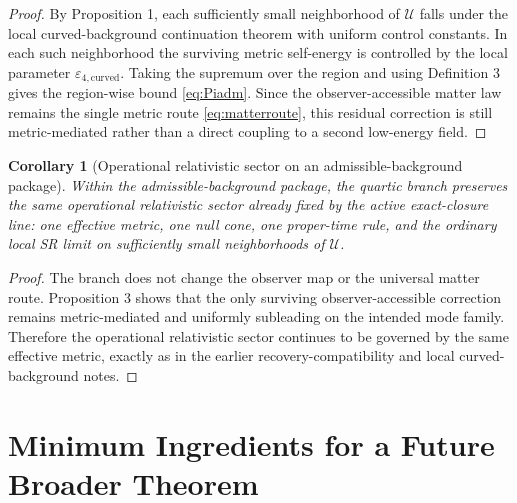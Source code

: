 \documentclass[11pt]{article}
\newtheorem{corollary}{Corollary}
\begin{document}
\begin{proof}
By Proposition 1, each sufficiently small neighborhood of \(\mathcal U\) falls under the local curved-background continuation theorem with uniform control constants. In each such neighborhood the surviving metric self-energy is controlled by the local parameter \(\varepsilon_{4,\mathrm{curved}}\). Taking the supremum over the region and using Definition 3 gives the region-wise bound \eqref{eq:Piadm}. Since the observer-accessible matter law remains the single metric route \eqref{eq:matterroute}, this residual correction is still metric-mediated rather than a direct coupling to a second low-energy field.
\end{proof}

\begin{corollary}[Operational relativistic sector on an admissible-background package]
Within the admissible-background package, the quartic branch preserves the same operational relativistic sector already fixed by the active exact-closure line: one effective metric, one null cone, one proper-time rule, and the ordinary local SR limit on sufficiently small neighborhoods of \(\mathcal U\).
\end{corollary}

\begin{proof}
The branch does not change the observer map or the universal matter route. Proposition 3 shows that the only surviving observer-accessible correction remains metric-mediated and uniformly subleading on the intended mode family. Therefore the operational relativistic sector continues to be governed by the same effective metric, exactly as in the earlier recovery-compatibility and local curved-background notes.
\end{proof}

\section{Minimum Ingredients for a Future Broader Theorem}
\end{document}
